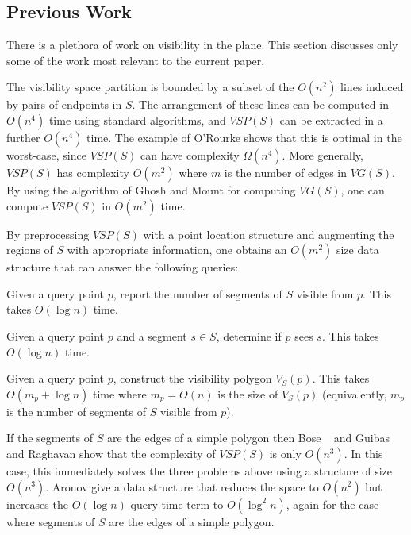 \documentclass{patmorin}
\newcommand{\VG}{\mathit{VG}}
\newcommand{\VSP}{\mathit{VSP}}
\begin{document}
\subsection{Previous Work}

There is a plethora of work on visibility in the plane.  This section
discusses only some of the work most relevant to the current paper.

The visibility space partition is bounded by a subset of the $O(n^2)$
lines induced by pairs of endpoints in $S$. The arrangement of these
lines can be computed in $O(n^4)$ time using standard algorithms, and
$\VSP(S)$ can be extracted in a further $O(n^4)$ time.  The example of
O'Rourke shows that this is optimal in the worst-case, since $\VSP(S)$
can have complexity $\Omega(n^4)$.  More generally, $\VSP(S)$ has
complexity $O(m^2)$ where $m$ is the number of edges in $\VG(S)$.
By using the algorithm of Ghosh and Mount for computing $\VG(S)$, one
can compute $\VSP(S)$ in $O(m^2)$ time.

By preprocessing $\VSP(S)$ with a point location structure and augmenting
the regions of $S$ with appropriate information, one obtains an $O(m^2)$
size data structure that can answer the following queries:

\begin{prb}
  Given a query point $p$, report the number of segments of $S$ visible
  from $p$.  This takes $O(\log n)$ time.
\end{prb}

\begin{prb}
  Given a query point $p$ and a segment $s\in S$, determine if $p$
  sees $s$.  This takes $O(\log n)$ time.
\end{prb}

\begin{prb}
  Given a query point $p$, construct the visibility polygon $V_S(p)$.
  This takes $O(m_p+\log n)$ time where $m_p=O(n)$ is the size of $V_S(p)$
  (equivalently, $m_p$ is the number of segments of $S$ visible from $p$).
\end{prb}

If the segments of $S$ are the edges of a simple polygon then Bose \etal\
\cite{X} and Guibas and Raghavan \cite{X} show that the complexity of
$\VSP(S)$ is only $O(n^3)$.  In this case, this immediately solves the
three problems above using a structure of size $O(n^3)$.  Aronov \etal
\cite{axxX} give a data structure that reduces the space to $O(n^2)$
but increases the $O(\log n)$ query time term to $O(\log^2 n)$, again for
the case where segments of $S$ are the edges of a simple polygon.
\end{document}
